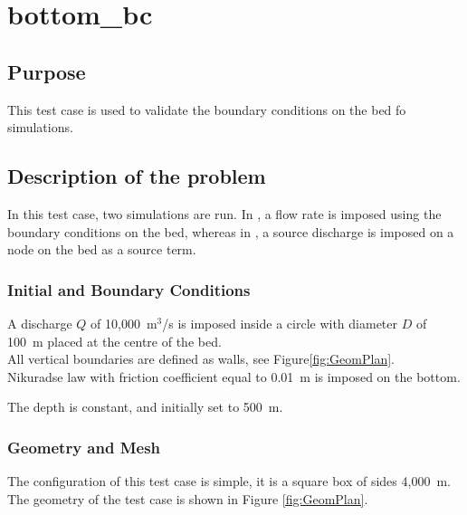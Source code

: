 \chapter{bottom\_bc}

\section{Purpose}

This test case is used to validate the boundary conditions on the bed fo
 simulations.

\section{Description of the problem}

In this test case, two simulations are run.
In , a flow rate is imposed using the boundary
conditions on the bed, whereas in ,
a source discharge is imposed on a node on the bed as a source term.

\subsection{Initial and Boundary Conditions}

A discharge $Q$ of 10,000~m$^3$/s is imposed inside a circle with diameter $D$
of 100~m placed at the centre of the bed.\\
All vertical boundaries are defined as walls, see Figure\ref{fig:GeomPlan}.\\
Nikuradse law with friction coefficient equal to 0.01~m is imposed on the bottom.

The depth is constant, and initially set to 500~m.

\subsection{Geometry and Mesh}

The configuration of this test case is simple, it is a square box of sides
4,000~m.
The geometry of the test case is shown in Figure \ref{fig:GeomPlan}.

